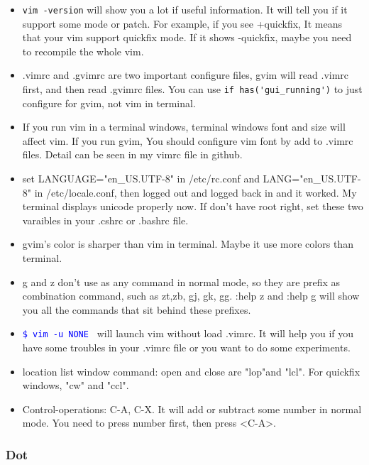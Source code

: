 \documentclass[a4paper,12pt,twoside]{book}
\newcommand{\linuxcommand}[1]{\texttt{\textcolor{blue}{\$ #1 \Pisymbol{psy}{191}}}}
\begin{document}
\begin{itemize}
		\item \verb=vim -version= will show you a lot if useful information. It will tell you if it support some mode or patch. For example, if you see +quickfix, It means that your vim support quickfix mode. If it shows -quickfix, maybe you need to recompile the whole vim.

		\item .vimrc and .gvimrc are two important configure files, gvim  will read .vimrc first, and then read .gvimrc files.  You can use \verb=if has('gui_running')= to just configure for gvim, not vim in terminal. 

		\item If you run vim in a terminal windows, terminal windows font and size will affect vim.  If you run gvim, You should configure vim font by add to .vimrc files. Detail can be seen in my vimrc file in github.

		\item set LANGUAGE="en\_US.UTF-8" in /etc/rc.conf and LANG="en\_US.UTF-8" in /etc/locale.conf, then logged out and logged back in and it worked. My terminal displays unicode properly now. If don't have root right, set these two varaibles in your .cshrc or .bashrc file.

		\item gvim's color is sharper than vim in terminal.  Maybe it use more colors than terminal.  

		\item g and z don't use as any command in normal mode, so they are prefix as combination command, such as zt,zb, gj, gk, gg. :help z and :help g will show you all the commands that sit behind these prefixes.

		\item \linuxcommand{vim -u NONE} will launch vim without load .vimrc. It will help you if you have some troubles in your .vimrc file or you want to do some experiments. 
				
		\item location list window command: open and close are "lop"and "lcl". For quickfix windows, "cw" and "ccl".
		
		\item Control-operations: C-A, C-X. It will add or subtract some number in normal mode. You need to press number first, then press <C-A>.
\end{itemize}

\subsubsection{Dot}
\end{document}
